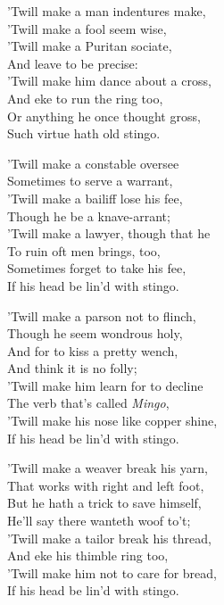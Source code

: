 \settowidth{\versewidth}{’Twill make him dance about a cross,}
\begin{dcverse}\begin{altverse}
’Twill make a man indentures make,\\
’Twill make a fool seem wise,\\
’Twill make a Puritan sociate,\\
And leave to be precise:\\
’Twill make him dance about a cross,\\
And eke to run the ring too,\\
Or anything he once thought gross,\\
Such virtue hath old stingo.
\end{altverse}

\begin{altverse}
’Twill make a constable oversee\\
Sometimes to serve a warrant,\\
’Twill make a bailiff lose his fee,\\
Though he be a knave-arrant;\\
’Twill make a lawyer, though that he\\
To ruin oft men brings, too,\\
Sometimes forget to take his fee,\\
If his head be lin’d with stingo.
\end{altverse}

\begin{altverse}
’Twill make a parson not to flinch,\\
Though he seem wondrous holy,\\
And for to kiss a pretty wench,\\
And think it is no folly;\\
’Twill make him learn for to decline\\
The verb that’s called \textit{Mingo},\\
’Twill make his nose like copper shine,\\
If his head be lin’d with stingo.
\end{altverse}

\begin{altverse}
’Twill make a weaver break his yarn,\\
That works with right and left foot,\\
But he hath a trick to save himself,\\
He’ll say there wanteth woof to’t;\\
’Twill make a tailor break his thread,\\
And eke his thimble ring too,\\
’Twill make him not to care for bread,\\
If his head be lin’d with stingo.
\end{altverse}


\end{dcverse}
